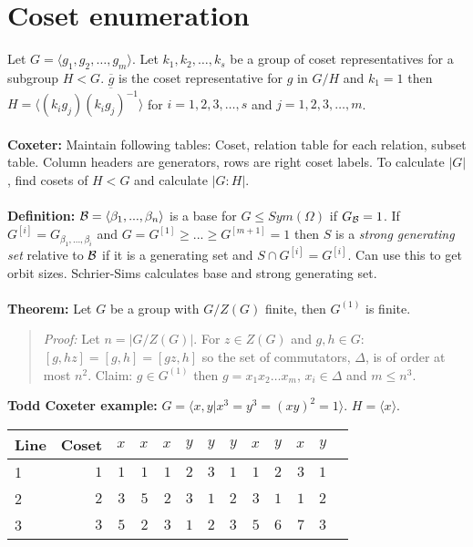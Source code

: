\section {Coset enumeration}
Let $G= \langle g_1 , g_2 , \ldots , g_m \rangle $.  Let $k_1 , k_2 , \ldots ,
k_s$ be a group of coset representatives for a subgroup $H < G$. ${\overline g}$
is the coset representative for $g$ in $G/H$ and $k_1 = 1$ then
$H= \langle (k_i g_j ) {\overline {(k_i g_j )^{-1}}} \rangle $
for $i= 1, 2, 3, \ldots , s$ and
$j= 1, 2, 3, \ldots , m$.
\\
\\
{\bf Coxeter:}
Maintain following tables: Coset, relation table
for each relation, subset table.  Column headers are generators, rows are
right coset labels.
To calculate $|G|$, find cosets of $H<G$ and calculate $|G:H|$.
\\
\\
{\bf Definition:}
${\cal B}= \langle \beta_1 , ... , \beta_n \rangle $ is a base for
$G \le Sym(\Omega)$ if $G_{\cal B} = 1$.
If $G^{[i]} = G_{\beta_1 , ..., \beta_i}$ and
$G=G^{[1]} \ge ... \ge G^{[m+1]}=1$ then
$S$ is a \emph{strong generating set} relative to ${\cal B}$ if
it is a generating set and $S \cap G^{[i]} = G^{[i]}$.  Can use this to get
orbit sizes.
Schrier-Sims calculates base and strong generating set.\\
\\
{\bf Theorem:}
Let $G$ be a group with $G/Z(G)$ finite, then $G^{(1)}$ is finite.
\begin{quote}
\emph{Proof:}
Let $n= |G/Z(G)|$.  For $z \in Z(G)$ and $g,h \in G$: $[g,hz]=[g,h]=[gz,h]$ so the
set of commutators, $\Delta$, is of order at most $n^2$.
Claim: $g \in G^{(1)}$ then $g= x_1 x_2 \ldots x_m$, $x_i \in \Delta$ and
$m \le n^3$.
\end{quote}
{\bf Todd Coxeter example:} $G= \langle x,y| x^3=y^3=(xy)^2=1 \rangle $.  $H= \langle x \rangle $.
\begin{center}
\begin{tabular} {|l||r|r|r|r||r|r|r||r|r|r|r|r|}
\hline
Line & Coset & $x$ & $x$ & $x$ & $y$ & $y$ & $y$ & $x$ & $y$ & $x$ & $y$\\
\hline
1 & $1$ & $1$ & $1$ & $1$ & $2$ & $3$ & $1$ & $1$ & $2$ & $3$ & $1$\\
\hline
2 & $2$ & $3$ & $5$ & $2$ & $3$ & $1$ & $2$ & $3$ & $1$ & $1$ & $2$\\
\hline
3 & $3$ & $5$ & $2$ & $3$ & $1$ & $2$ & $3$ & $5$ & $6$ & $7$ & $3$\\
\hline
\end{tabular}
\end{center}

